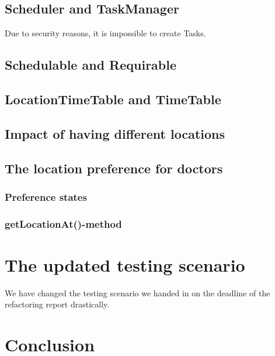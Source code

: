\documentclass[12pt]{article}
\begin{document}
\subsection{Scheduler and TaskManager}
Due to security reasons, it is impossible to create Tasks. 
\subsection{Schedulable and Requirable}
\subsection{LocationTimeTable and TimeTable}
\subsection{Impact of having different locations}
\subsection{The location preference for doctors}
\subsubsection{Preference states}
\subsubsection{getLocationAt()-method}

\section{The updated testing scenario}
We have changed the testing scenario we handed in on the deadline of the refactoring report drastically.
\section{Conclusion}
\end{document}
